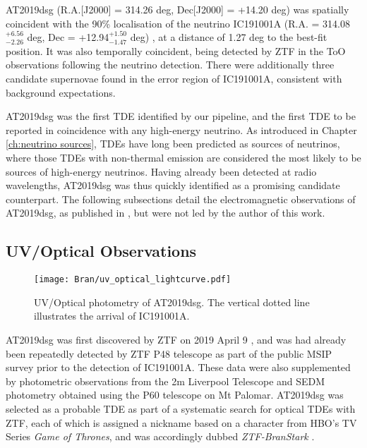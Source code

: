 AT2019dsg (R.A.[J2000] = 314.26 deg, Dec[J2000] = +14.20 deg) was spatially coincident with the 90\% localisation of the neutrino IC191001A (R.A. = 314.08$^{+6.56}_{-2.26}$ deg,  Dec = +12.94$^{+1.50}_{-1.47}$ deg) \cite{stein:gcn25913}, at a distance of 1.27 deg to the best-fit position. It was also temporally coincident, being detected by ZTF in the ToO observations following the neutrino detection. There were additionally three candidate supernovae found in the error region of IC191001A, consistent with background expectations. 

AT2019dsg was the first TDE identified by our pipeline, and the first TDE to be reported in coincidence with any high-energy neutrino. As introduced in Chapter \ref{ch:neutrino sources}, TDEs have long been predicted as sources of neutrinos, where those TDEs with non-thermal emission are considered the most likely to be sources of high-energy neutrinos. Having already been detected at radio wavelengths, AT2019dsg was thus quickly identified as a promising candidate counterpart. The following subsections detail the electromagnetic observations of AT2019dsg, as published in \cite{bran}, but were not led by the author of this work.

\subsection*{UV/Optical Observations}

\begin{figure}[!ht]
	\texttt{[image: Bran/uv\_optical\_lightcurve.pdf]}
	\caption{UV/Optical photometry of AT2019dsg. The vertical dotted line illustrates the arrival of IC191001A.}
	\label{fig:bran_optical_lightcurve}
\end{figure}

AT2019dsg was first discovered by ZTF on 2019 April 9 , and was had already been repeatedly detected by ZTF P48 telescope as part of the public MSIP survey prior to the detection of IC191001A.  These data were also supplemented by photometric observations from the 2m Liverpool Telescope  and SEDM  photometry obtained using the P60 telescope on Mt Palomar. AT2019dsg was selected as a probable TDE as part of a systematic search for optical TDEs with ZTF, each of which is assigned a nickname based on a character from HBO's TV Series \emph{Game of Thrones}, and was accordingly dubbed \emph{ZTF-BranStark} .


